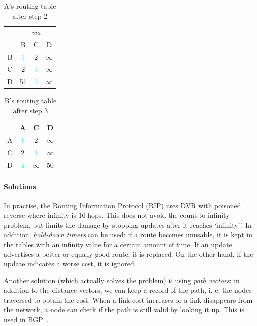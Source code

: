 \documentclass[12pt,a4paper]{article}
\begin{document}
\begin{table}[!ht]
\centering
\begin{tabular}{c|ccc}
	& \multicolumn{3}{c}{\textit{via}} \\
	&	B			&	C			&	D			\\
\hline
B	& 	\textcolor{Cyan}{1}	&	2			&	$\infty$	\\
C	&	2			&	\textcolor{Cyan}{1}	&	$\infty$	\\
D	&	51			&	\textcolor{Cyan}{3}			&	$\infty$	\\
\end{tabular}
\caption{A's routing table after step 2}
\end{table}

\begin{table}[!ht]
\centering
\begin{tabular}{c|ccc}
	&	A			&	C			&	D			\\
\hline
A	& 	\textcolor{Cyan}{1}	&	2			&	$\infty$	\\
C	&	2			&	\textcolor{Cyan}{1}	&	$\infty$	\\
D	&	\textcolor{Cyan}{4}	&	$\infty$	&	50			\\
\end{tabular}
\caption{B's routing table after step 3}
\end{table}

\paragraph{Solutions}
In practise, the Routing Information Protocol (RIP) uses DVR with poisoned reverse where infinity is 16 hops. This does not avoid the count-to-infinity problem, but limits the damage by stopping updates after it reaches `ìnfinity''.
In addition, \textit{hold-down timers} can be used: if a route becomes unusable, it is kept in the tables with an infinity value for a certain amount of time. If an update advertises a better or equally good route, it is replaced. On the other hand, if the update indicates a worse cost, it is ignored. 

Another solution (which actually solves the problem) is using \textit{path vectors}: in addition to the distance vectors, we can keep a record of the path, i. e. the nodes traversed to obtain the cost. When a link cost increases or a link disappears from the network, a node can check if the path is still valid by looking it up. This is used in BGP~\cite{mit}.



\nocite{*}
    
\end{document}

